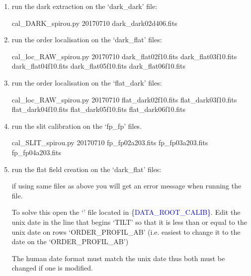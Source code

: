 \begin{enumerate}

\item run the dark extraction on the `dark\_dark' file:
\begin{cmdbox}
cal_DARK_spirou.py 20170710 dark_dark02d406.fits
\end{cmdbox}

\item run the order localisation on the `dark\_flat' files:
\begin{cmdbox}
cal_loc_RAW_spirou.py 20170710 dark_flat02f10.fits dark_flat03f10.fits dark_flat04f10.fits dark_flat05f10.fits dark_flat06f10.fits
\end{cmdbox}

\item run the order localisation on the `flat\_dark' files:
\begin{cmdbox}
cal_loc_RAW_spirou.py 20170710 flat_dark02f10.fits flat_dark03f10.fits flat_dark04f10.fits flat_dark05f10.fits flat_dark06f10.fits
\end{cmdbox}

\item run the slit calibration on the `fp\_fp' files.
\begin{cmdbox}
cal_SLIT_spirou.py 20170710 fp_fp02a203.fits fp_fp03a203.fits fp_fp04a203.fits
\end{cmdbox}

\item run the flat field creation on the `dark\_flat' files:

\begin{note}
if using same files as above you will get an error message when running the file.

\noindent To solve this open the `\masterCALIBDBfile' file located in \textcolor{blue}{\{DATA\_ROOT\_CALIB\}}. Edit the unix date in the line that begins `TILT' so that it is less than or equal to the unix date on rows `ORDER\_PROFIL\_AB' (i.e. easiest to change it to the date on the `ORDER\_PROFIL\_AB')

\noindent The human date format must match the unix date thus both must be changed if one is modified.


\end{note}
\end{enumerate}
